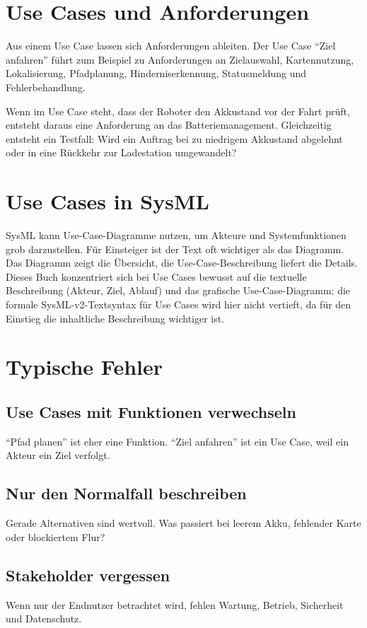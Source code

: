 \section{Use Cases und Anforderungen}
Aus einem Use Case lassen sich Anforderungen ableiten. Der Use Case \enquote{Ziel anfahren} führt zum Beispiel zu Anforderungen an Zielauswahl, Kartennutzung, Lokalisierung, Pfadplanung, Hinderniserkennung, Statusmeldung und Fehlerbehandlung.

\begin{praxisbox}
Wenn im Use Case steht, dass der Roboter den Akkustand vor der Fahrt prüft, entsteht daraus eine Anforderung an das Batteriemanagement. Gleichzeitig entsteht ein Testfall: Wird ein Auftrag bei zu niedrigem Akkustand abgelehnt oder in eine Rückkehr zur Ladestation umgewandelt?
\end{praxisbox}

\section{Use Cases in SysML}
SysML kann Use-Case-Diagramme nutzen, um Akteure und Systemfunktionen grob darzustellen. Für Einsteiger ist der Text oft wichtiger als das Diagramm. Das Diagramm zeigt die Übersicht, die Use-Case-Beschreibung liefert die Details. Dieses Buch konzentriert sich bei Use Cases bewusst auf die textuelle Beschreibung (Akteur, Ziel, Ablauf) und das grafische Use-Case-Diagramm; die formale SysML-v2-Textsyntax für Use Cases wird hier nicht vertieft, da für den Einstieg die inhaltliche Beschreibung wichtiger ist.

\section{Typische Fehler}
\subsection{Use Cases mit Funktionen verwechseln}
\enquote{Pfad planen} ist eher eine Funktion. \enquote{Ziel anfahren} ist ein Use Case, weil ein Akteur ein Ziel verfolgt.

\subsection{Nur den Normalfall beschreiben}
Gerade Alternativen sind wertvoll. Was passiert bei leerem Akku, fehlender Karte oder blockiertem Flur?

\subsection{Stakeholder vergessen}
Wenn nur der Endnutzer betrachtet wird, fehlen Wartung, Betrieb, Sicherheit und Datenschutz.

